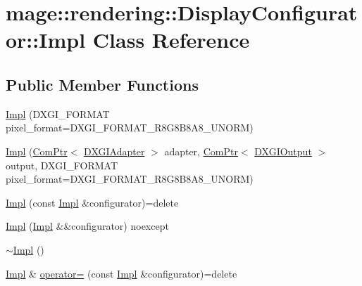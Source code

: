 \hypertarget{classmage_1_1rendering_1_1_display_configurator_1_1_impl}{}\section{mage\+:\+:rendering\+:\+:Display\+Configurator\+:\+:Impl Class Reference}
\label{classmage_1_1rendering_1_1_display_configurator_1_1_impl}
\subsection*{Public Member Functions}
\begin{DoxyCompactItemize}
\item 
\mbox{\hyperlink{classmage_1_1rendering_1_1_display_configurator_1_1_impl_af2385f84a5d80cf92a1d6afe2343a872}{Impl}} (D\+X\+G\+I\+\_\+\+F\+O\+R\+M\+AT pixel\+\_\+format=D\+X\+G\+I\+\_\+\+F\+O\+R\+M\+A\+T\+\_\+\+R8\+G8\+B8\+A8\+\_\+\+U\+N\+O\+RM)
\item 
\mbox{\hyperlink{classmage_1_1rendering_1_1_display_configurator_1_1_impl_ad71f98da03418a9afcfaa8acf94a0da9}{Impl}} (\mbox{\hyperlink{namespacemage_ae74f374780900893caa5555d1031fd79}{Com\+Ptr}}$<$ \mbox{\hyperlink{namespacemage_1_1rendering_ad55e028ebd705b547eeb972ad8d03b6a}{D\+X\+G\+I\+Adapter}} $>$ adapter, \mbox{\hyperlink{namespacemage_ae74f374780900893caa5555d1031fd79}{Com\+Ptr}}$<$ \mbox{\hyperlink{namespacemage_1_1rendering_aaf22d3893277a4bd8497f6ea69b01532}{D\+X\+G\+I\+Output}} $>$ output, D\+X\+G\+I\+\_\+\+F\+O\+R\+M\+AT pixel\+\_\+format=D\+X\+G\+I\+\_\+\+F\+O\+R\+M\+A\+T\+\_\+\+R8\+G8\+B8\+A8\+\_\+\+U\+N\+O\+RM)
\item 
\mbox{\hyperlink{classmage_1_1rendering_1_1_display_configurator_1_1_impl_acf8b6a3749108ad9f7a7c14c291d48b6}{Impl}} (const \mbox{\hyperlink{classmage_1_1rendering_1_1_display_configurator_1_1_impl}{Impl}} \&configurator)=delete
\item 
\mbox{\hyperlink{classmage_1_1rendering_1_1_display_configurator_1_1_impl_af8ddd060b24cd09deb2beef7737f5277}{Impl}} (\mbox{\hyperlink{classmage_1_1rendering_1_1_display_configurator_1_1_impl}{Impl}} \&\&configurator) noexcept
\item 
\mbox{\hyperlink{classmage_1_1rendering_1_1_display_configurator_1_1_impl_a499b92d9d77a4c31cbdefa3a3c22a0be}{$\sim$\+Impl}} ()
\item 
\mbox{\hyperlink{classmage_1_1rendering_1_1_display_configurator_1_1_impl}{Impl}} \& \mbox{\hyperlink{classmage_1_1rendering_1_1_display_configurator_1_1_impl_afaffb2c4689dd48c195d2a7f12c11e0b}{operator=}} (const \mbox{\hyperlink{classmage_1_1rendering_1_1_display_configurator_1_1_impl}{Impl}} \&configurator)=delete

\end{DoxyCompactItemize}
